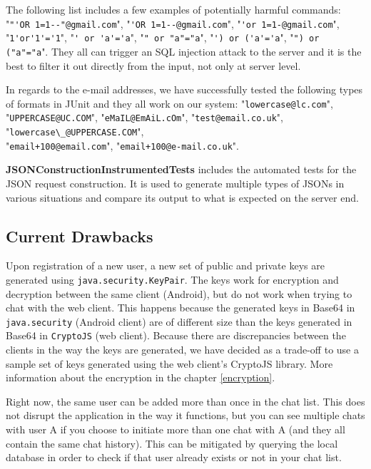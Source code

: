 The following list includes a few examples of potentially harmful commands: \\
"\verb|"'OR 1=1--"@gmail.com|", "\verb|'OR 1=1--@gmail.com|", "\verb|'or 1=1-@gmail.com|", \\
"\verb|1'or'1'='1|", "\verb|' or 'a'='a|", "\verb|" or "a"="a|", "\verb|') or ('a'='a|", "\verb|") or ("a"="a|". They all can trigger an SQL injection attack to the server and it is the best to filter it out directly from the input, not only at server level.

In regards to the e-mail addresses, we have successfully tested the following types of formats in JUnit and they all work on our system: "\verb|lowercase@lc.com|", "\verb|UPPERCASE@UC.COM|", "\verb|eMaIL@EmAiL.cOm|", "\verb|test@email.co.uk|", "\verb|lowercase\_@UPPERCASE.COM|", \\ "\verb|email+100@email.com|", "\verb|email+100@e-mail.co.uk|".


\textbf{JSONConstructionInstrumentedTests} includes the automated tests for the JSON request construction. It is used to generate multiple types of JSONs in various situations and compare its output to what is expected on the server end.

\subsection{Current Drawbacks}

Upon registration of a new user, a new set of public and private keys are generated using \verb|java.security.KeyPair|. The keys work for encryption and decryption between the same client (Android), but do not work when trying to chat with the web client. This happens because the generated keys in Base64 in \verb|java.security| (Android client) are of different size than the keys generated in Base64 in \verb|CryptoJS| (web client). Because there are discrepancies between the clients in the way the keys are generated, we have decided as a trade-off to use a sample set of keys generated using the web client's CryptoJS library. More information about the encryption in the chapter \ref{encryption}.

Right now, the same user can be added more than once in the chat list. This does not disrupt the application in the way it functions, but you can see multiple chats with user A if you choose to initiate more than one chat with A (and they all contain the same chat history). This can be mitigated by querying the local database in order to check if that user already exists or not in your chat list.

